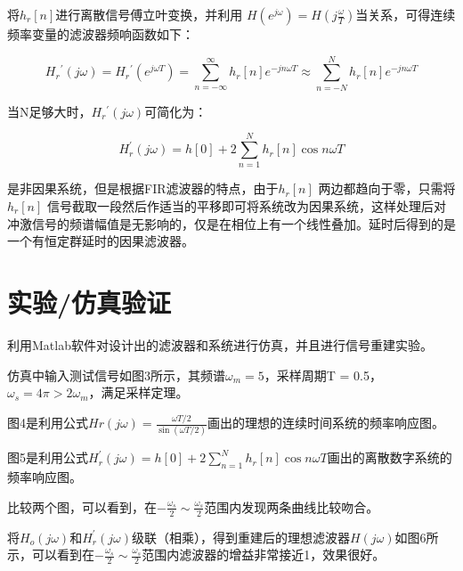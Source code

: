 \documentclass{../source/Experiment}
\begin{document}
            将$h_{r}[n]$进行离散信号傅立叶变换，并利用 $H\left(e^{j \omega}\right)=H\left(j \frac{\omega}{T}\right)$当关系，可得连续频率变量的滤波器频响函数如下：
            
            $$H_{r}{ }^{\prime}(j \omega)=H_{r}{ }^{\prime}\left(e^{j \omega T}\right)=\sum_{n=-\infty}^{\infty} h_r[n] e^{-j n \omega T} \approx \sum_{n=-N}^{N} h_r[n] e^{-j n \omega T}$$
            
            当N足够大时，$H_{r}{ }^{\prime}(j \omega)$可简化为：
            
            $$H_{r}^{\prime}(j \omega)=h[0]+2 \sum_{n=1}^{N} h_r[n] \cos n \omega T$$

            是非因果系统，但是根据FIR滤波器的特点，由于$h_{r}[n]$ 两边都趋向于零，只需将$h_{r}[n]$ 信号截取一段然后作适当的平移即可将系统改为因果系统，这样处理后对冲激信号的频谱幅值是无影响的，仅是在相位上有一个线性叠加。延时后得到的是一个有恒定群延时的因果滤波器。


    \section{实验/仿真验证}
            利用Matlab软件对设计出的滤波器和系统进行仿真，并且进行信号重建实验。

            仿真中输入测试信号如图3所示，其频谱$\omega _m = 5 $，采样周期T = 0.5，$\omega _s = 4 \pi > 2 \omega_m$，满足采样定理。

            图4是利用公式$H r(j \omega)= \frac{\omega T / 2}{\sin (\omega T / 2)}$画出的理想的连续时间系统的频率响应图。

            图5是利用公式$H_{r}^{\prime}(j \omega)=h[0]+2 \sum_{n=1}^{N} h_r[n] \cos n \omega T$画出的离散数字系统的频率响应图。

            比较两个图，可以看到，在$- \frac{\omega_s}{2} \sim \frac{\omega_s}{2}$范围内发现两条曲线比较吻合。

            将$H_o(j\omega)$和$H_{r}^{\prime}(j \omega)$级联（相乘），得到重建后的理想滤波器$H(j \omega)$如图6所示，可以看到在$- \frac{\omega_s}{2} \sim \frac{\omega_s}{2}$范围内滤波器的增益非常接近1，效果很好。
            
\end{document}
